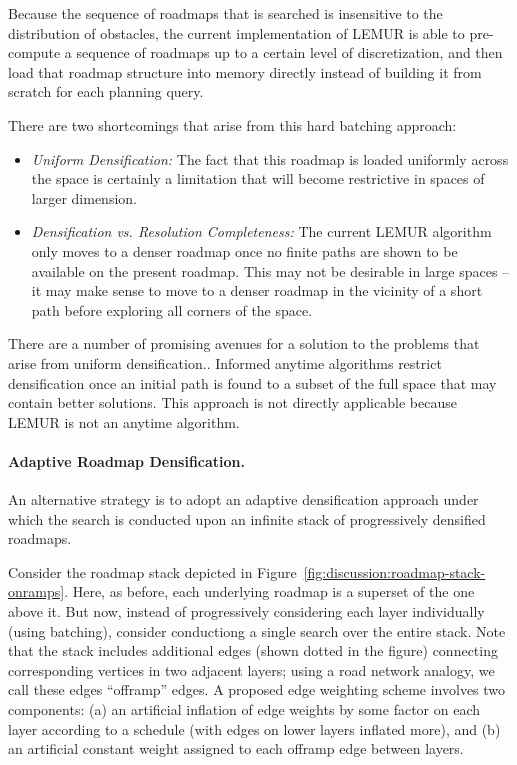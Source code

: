 Because the sequence of roadmaps that is searched is insensitive to
the distribution of obstacles,
the current implementation of LEMUR is able to pre-compute a sequence
of roadmaps up to a certain level of discretization,
and then load that roadmap structure into memory directly
instead of building it from scratch for each planning query.

There are two shortcomings that arise from this hard batching approach:

\begin{itemize}
\item \emph{Uniform Densification:}
   The fact that this roadmap is loaded uniformly across the space
   is certainly a limitation that will become restrictive
   in spaces of larger dimension.
\item \emph{Densification vs. Resolution Completeness:}
   The current LEMUR algorithm only moves to a denser roadmap
   once no finite paths are shown to be available on the present
   roadmap.
   This may not be desirable in large spaces --
   it may make sense to move to a denser roadmap in the vicinity of
   a short path before exploring all corners of the space.
\end{itemize}

There are a number of promising avenues for a solution
to the problems that arise from uniform densification..
Informed anytime algorithms
\citep{gammell2014informedrrtstar, gammell2015bitstar}
restrict densification once an initial path is found to a subset of
the full space that may contain better solutions.
This approach is not directly applicable
because LEMUR is not an anytime algorithm.

\paragraph{Adaptive Roadmap Densification.}
An alternative strategy is to adopt an adaptive densification approach
under which the search is conducted upon an infinite stack of
progressively densified roadmaps.

Consider the roadmap stack depicted
in Figure~\ref{fig:discussion:roadmap-stack-onramps}.
Here, as before,
each underlying roadmap is a superset of the one above it.
But now,
instead of progressively considering each layer individually
(using batching),
consider conductiong a single search over the entire stack.
Note that the stack includes additional edges
(shown dotted in the figure)
connecting corresponding vertices in two adjacent layers;
using a road network analogy,
we call these edges ``offramp'' edges.
A proposed edge weighting scheme involves two components:
(a) an artificial inflation of edge weights by some factor
on each layer according to a schedule
(with edges on lower layers inflated more),
and (b) an artificial constant weight assigned to each offramp edge
between layers.

